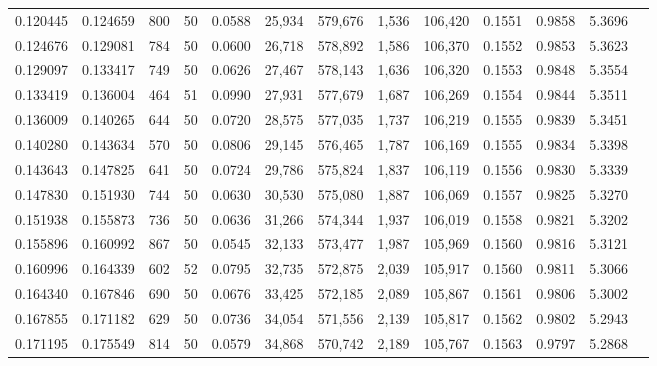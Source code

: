 \begin{tabular}{rrrrrrrrrrrrr}
0.120445 & 0.124659 &   800 &  50 &                                     0.0588 &  25,934 & 579,676 &   1,536 & 106,420 & 0.1551 & 0.9858 & 5.3696 \\
0.124676 & 0.129081 &   784 &  50 &                                     0.0600 &  26,718 & 578,892 &   1,586 & 106,370 & 0.1552 & 0.9853 & 5.3623 \\
0.129097 & 0.133417 &   749 &  50 &                                     0.0626 &  27,467 & 578,143 &   1,636 & 106,320 & 0.1553 & 0.9848 & 5.3554 \\
0.133419 & 0.136004 &   464 &  51 &                                     0.0990 &  27,931 & 577,679 &   1,687 & 106,269 & 0.1554 & 0.9844 & 5.3511 \\
0.136009 & 0.140265 &   644 &  50 &                                     0.0720 &  28,575 & 577,035 &   1,737 & 106,219 & 0.1555 & 0.9839 & 5.3451 \\
0.140280 & 0.143634 &   570 &  50 &                                     0.0806 &  29,145 & 576,465 &   1,787 & 106,169 & 0.1555 & 0.9834 & 5.3398 \\
0.143643 & 0.147825 &   641 &  50 &                                     0.0724 &  29,786 & 575,824 &   1,837 & 106,119 & 0.1556 & 0.9830 & 5.3339 \\
0.147830 & 0.151930 &   744 &  50 &                                     0.0630 &  30,530 & 575,080 &   1,887 & 106,069 & 0.1557 & 0.9825 & 5.3270 \\
0.151938 & 0.155873 &   736 &  50 &                                     0.0636 &  31,266 & 574,344 &   1,937 & 106,019 & 0.1558 & 0.9821 & 5.3202 \\
0.155896 & 0.160992 &   867 &  50 &                                     0.0545 &  32,133 & 573,477 &   1,987 & 105,969 & 0.1560 & 0.9816 & 5.3121 \\
0.160996 & 0.164339 &   602 &  52 &                                     0.0795 &  32,735 & 572,875 &   2,039 & 105,917 & 0.1560 & 0.9811 & 5.3066 \\
0.164340 & 0.167846 &   690 &  50 &                                     0.0676 &  33,425 & 572,185 &   2,089 & 105,867 & 0.1561 & 0.9806 & 5.3002 \\
0.167855 & 0.171182 &   629 &  50 &                                     0.0736 &  34,054 & 571,556 &   2,139 & 105,817 & 0.1562 & 0.9802 & 5.2943 \\
0.171195 & 0.175549 &   814 &  50 &                                     0.0579 &  34,868 & 570,742 &   2,189 & 105,767 & 0.1563 & 0.9797 & 5.2868 \\

\end{tabular}
